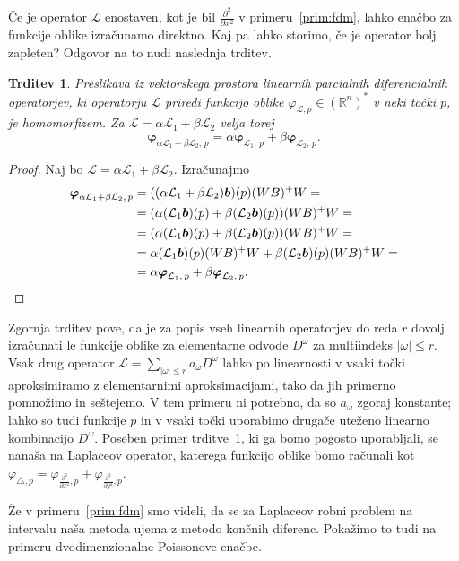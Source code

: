 \documentclass[12pt,a4paper,twoside]{article}
\theoremstyle{definition} %
\theoremstyle{plain} %
\newtheorem{trditev}[definicija]{Trditev}
\numberwithin{equation}{section}
\newcommand{\R}{\mathbb R}
\renewcommand{\L}{\mathcal{L}}
\newcommand{\lap}{\triangle}
\renewcommand{\b}{\boldsymbol}
\renewcommand{\phi}{\varphi}
\newcommand{\dpar}[2]{\ensuremath{\frac{\partial #1}{\partial #2}}}
\begin{document}
Če je operator $\L$ enostaven, kot je bil $\dpar{^2}{x^2}$ v primeru~\ref{prim:fdm},
lahko enačbo za funkcije oblike izračunamo direktno. Kaj pa lahko storimo, če je operator bolj
zapleten? Odgovor na to nudi naslednja trditev.
\begin{trditev}
  \label{trd:shape-linear}
  Preslikava iz vektorskega prostora linearnih parcialnih diferencialnih operatorjev, ki operatorju
  $\L$ priredi funkcijo oblike $\phi_{\L, p} \in (\R^n)^\ast$ v neki točki $p$, je homomorfizem. Za
  $\L = \alpha \L_1 + \beta \L_2$ velja torej
  \begin{equation}
    \b{\phi}_{\alpha \L_1 + \beta \L_2,\,p} =  \alpha \b{\phi}_{\L_1,\,p} + \beta \b{\phi}_{\L_2,\,p}.
  \end{equation}
\end{trditev}
\begin{proof}
Naj bo $\L = \alpha \L_1 + \beta \L_2$. Izračunajmo
  \begin{align*}
    \b{\phi}_{\alpha \L_1 + \beta \L_2,\,p} &=
    ((\alpha \L_1 + \beta \L_2)\b b)(p)(WB)^+W = \\
    &= (\alpha (\L_1\b b)(p) + \beta (\L_2\b b)(p))(WB)^+W = \\
    &= (\alpha (\L_1\b b)(p) + \beta (\L_2\b b)(p))(WB)^+W =\\
  &= \alpha (\L_1\b b)(p)(WB)^+W + \beta (\L_2\b b)(p)(WB)^+W = \\
  &= \alpha \b{\phi}_{\L_1,\,p} + \beta \b{\phi}_{\L_2,\,p}. \qedhere
  \end{align*}
\end{proof}
Zgornja trditev pove, da je za popis vseh linearnih operatorjev do reda $r$ dovolj izračunati le
funkcije oblike za elementarne odvode $D^\omega$ za multiindeks $|\omega| \leq r$. Vsak drug
operator $\L = \sum_{|\omega| \leq r} a_\omega D^\omega$ lahko po linearnosti v vsaki točki
aproksimiramo z elementarnimi aproksimacijami, tako da jih primerno pomnožimo in seštejemo. V tem
primeru ni potrebno, da so $a_\omega$ zgoraj konstante; lahko so tudi funkcije $p$ in v vsaki točki
uporabimo drugače uteženo linearno kombinacijo $D^\omega$. Poseben primer
trditve~\ref{trd:shape-linear}, ki ga bomo pogosto uporabljali, se nanaša na Laplaceov operator,
katerega funkcijo oblike bomo računali kot $\phi_{\lap, p} = \phi_{\dpar{^2}{x^2}, p} +
\phi_{\dpar{^2}{y^2}, p}$.

Že v primeru~\ref{prim:fdm} smo videli, da se za Laplaceov robni problem na
intervalu naša metoda ujema z metodo končnih diferenc. Pokažimo to tudi na
primeru dvodimenzionalne Poissonove enačbe.
\end{document}

